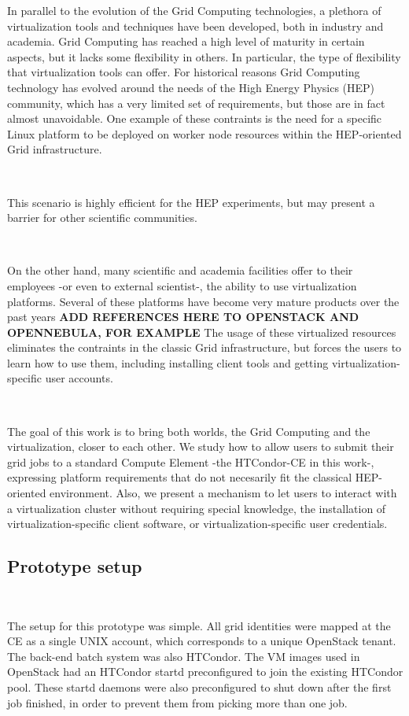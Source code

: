 \documentclass[a4paper]{jpconf}
\begin{document}
In parallel to the evolution of the Grid Computing technologies, a plethora of
virtualization tools and techniques have been developed, both in industry and academia.
Grid Computing has reached a high level of maturity in certain aspects, but it
lacks some flexibility in others.
In particular, the type of flexibility that virtualization tools can offer. 
For historical reasons Grid Computing technology has evolved around the needs of the High Energy Physics (HEP) community, 
which has a very limited set of requirements, but those are in fact almost
unavoidable. One example of these contraints is the need for a specific Linux
platform to be deployed on worker node resources within the HEP-oriented
Grid infrastructure.

~

This scenario is highly efficient for the HEP experiments, 
but may present a barrier for other scientific communities.

~

On the other hand, many scientific and academia facilities offer to their employees -or even to external scientist-,
the ability to use virtualization platforms. 
Several of these platforms have become very mature products over the past years \textbf{ADD REFERENCES HERE TO OPENSTACK AND OPENNEBULA, FOR EXAMPLE} \newline
The usage of these virtualized resources eliminates the contraints in the
classic Grid infrastructure, but forces the users to learn how to use them,
including installing client tools and getting virtualization-specific
user accounts.

~

The goal of this work is to bring both worlds, the Grid Computing and the virtualization, closer to each other. 
We study how to allow users to submit their grid jobs to a standard Compute Element -the HTCondor-CE in this work-,
expressing platform requirements that do not necesarily fit the classical HEP-oriented environment.
Also, we present a mechanism to let users to interact with a virtualization cluster without requiring
special knowledge, the installation of virtualization-specific client software,
or virtualization-specific user credentials.

\subsection{Prototype setup}

~

The setup for this prototype was simple. 
All grid identities were mapped at the CE as a single UNIX account, which
corresponds to a unique OpenStack tenant.
The back-end batch system was also HTCondor.
The VM images used in OpenStack had an HTCondor startd preconfigured to join the
existing HTCondor pool.
These startd daemons were also preconfigured to shut down after the first job finished, in order to prevent them from picking more than one job. 
\end{document}
